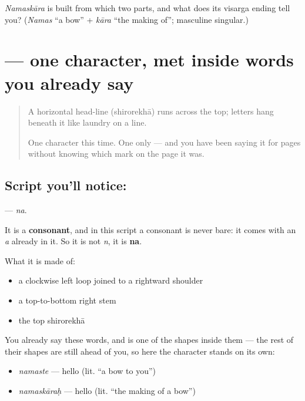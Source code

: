 \begin{tcolorbox}[breakable,colback=teal!4,colframe=teal!35!black,title={Before you move on}]
\emph{Namaskāra} is built from which two parts, and what does its visarga ending tell you? (\emph{Namas} \textquotedblleft{}a bow\textquotedblright{} + \emph{kāra} \textquotedblleft{}the making of\textquotedblright{}; masculine singular.)
\end{tcolorbox}
\section[\texorpdfstring{\sk{न} (na)}{न (na)}]{ — one character, met inside words you already say}

\label{lesson:SA-S02-letter-na}



\begin{quote}
A horizontal head-line (shirorekhā) runs across the top; letters hang beneath it like laundry on a line.

One character this time. One only — and you have been saying it for pages without knowing which mark on the page it was.
\end{quote}

\subsection*{Script you'll notice: }
\textbf{} — \emph{na}.

It is a \textbf{consonant}, and in this script a consonant is never bare: it comes with an \emph{a} already in it. So it is not \emph{n}, it is \textbf{na}.

What it is made of:

\begin{itemize}
\raggedright
  \item a clockwise left loop joined to a rightward shoulder
  \item a top-to-bottom right stem
  \item the top shirorekhā
\end{itemize}

You already say these words, and  is one of the shapes inside them — the rest of their shapes are still ahead of you, so here the character stands on its own:

\begin{itemize}
\raggedright
  \item \emph{namaste} — hello (lit. \textquotedblleft{}a bow to you\textquotedblright{})
  \item \emph{namaskāraḥ} — hello (lit. \textquotedblleft{}the making of a bow\textquotedblright{})
\end{itemize}

